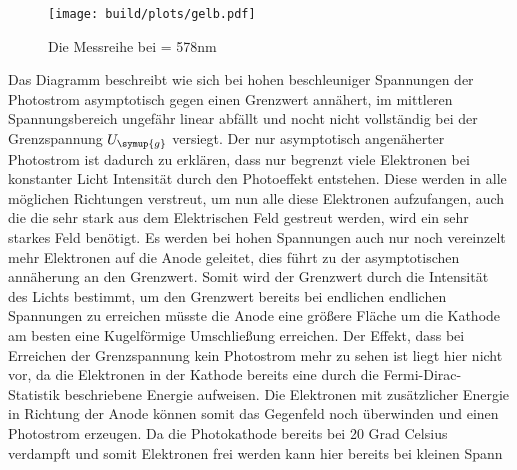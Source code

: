     \begin{figure}[H]
        \centering
        \texttt{[image: build/plots/gelb.pdf]}
        \caption{Die Messreihe bei \lambda = 578nm}
        \label{img:gelb}
    \end{figure}

    Das Diagramm beschreibt wie sich bei hohen beschleuniger Spannungen der Photostrom asymptotisch gegen einen Grenzwert annähert, im mittleren 
    Spannungsbereich ungefähr linear abfällt und nocht nicht vollständig bei der Grenzspannung $U_{\symup{g}}$ versiegt.
    Der nur asymptotisch angenäherter Photostrom ist dadurch zu erklären, dass nur begrenzt viele Elektronen bei konstanter Licht Intensität 
    durch den Photoeffekt entstehen. Diese werden in alle möglichen Richtungen verstreut, um nun alle diese Elektronen aufzufangen, auch die die sehr 
    stark aus dem Elektrischen Feld gestreut werden, wird ein sehr starkes Feld benötigt. Es werden bei hohen Spannungen auch nur noch vereinzelt
    mehr Elektronen auf die Anode geleitet, dies führt zu der asymptotischen annäherung an den Grenzwert. Somit wird der Grenzwert durch die 
    Intensität des Lichts bestimmt, um den Grenzwert bereits bei endlichen endlichen Spannungen zu erreichen müsste die Anode eine größere Fläche 
    um die Kathode am besten eine Kugelförmige Umschließung erreichen.
    Der Effekt, dass bei Erreichen der Grenzspannung kein Photostrom mehr zu sehen ist liegt hier nicht vor, da die Elektronen in der Kathode 
    bereits eine durch die Fermi-Dirac-Statistik beschriebene Energie aufweisen. Die Elektronen mit zusätzlicher Energie in Richtung der Anode 
    können somit das Gegenfeld noch überwinden und einen Photostrom erzeugen.
    Da die Photokathode bereits bei 20 Grad Celsius verdampft und somit Elektronen frei werden kann hier bereits bei kleinen Spann


